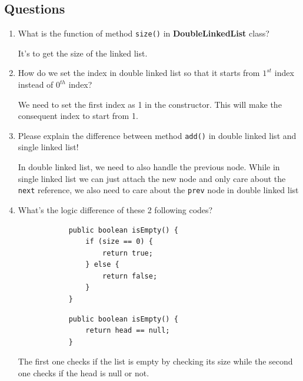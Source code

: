\documentclass[12pt,titlepage]{article}
\begin{document}
\subsection*{Questions}
\begin{enumerate}
    \item {
        What is the function of method \texttt{size()} in \textbf{DoubleLinkedList} class?

        It's to get the size of the linked list.
    }
    \item {
        How do we set the index in double linked list so that it starts from $1^{st}$ index instead of $0^{th}$ index?

        We need to set the first index as 1 in the constructor. This will make the consequent index to start from 1.
    }
    \item {
        Please explain the difference between method \texttt{add()} in double linked list and single linked list!

        In double linked list, we need to also handle the previous node. While in single linked list we can just attach the new node and only care about the \texttt{next} reference,
        we also need to care about the \texttt{prev} node in double linked list
    }
    \item {
        What's the logic difference of these 2 following codes?

        \begin{verbatim}
            public boolean isEmpty() {
                if (size == 0) {
                    return true;
                } else {
                    return false;
                }
            }
        \end{verbatim}

        \begin{verbatim}
            public boolean isEmpty() {
                return head == null;
            }
        \end{verbatim}

        The first one checks if the list is empty by checking its size while the second one checks if the head is null or not.
    }
\end{enumerate}
\end{document}
